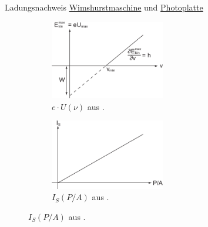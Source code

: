 \documentclass{article}
\begin{document}
\begin{Experiment}{Ladungsnachweis \href{https://de.wikipedia.org/wiki/Wimshurstmaschine}{Wimshurstmaschine} und \href{https://de.wikipedia.org/wiki/Fotoplatte}{Photoplatte}}
\begin{figure}[H]
            \begin{subfigure}[b]{0.4\textwidth}
                \centering
                \includegraphics[width=5cm]{Bilddateien/UvonNu-Photoeffekt.png}
                \caption{$e\cdot U(\nu)$ aus \cite{ethz:Photoeffekt}.}
            \end{subfigure}
            \hspace{1cm}
            \begin{subfigure}[b]{0.4\textwidth}
                \centering
                \includegraphics[width=5cm]{Bilddateien/Saettigungsstrom-Photoeffekt.png}
                \caption[short]{$I_S(P/A)$ aus \cite{ethz:Photoeffekt}.}
            \end{subfigure}
        \end{figure}
    \end{Experiment}
\end{document}
